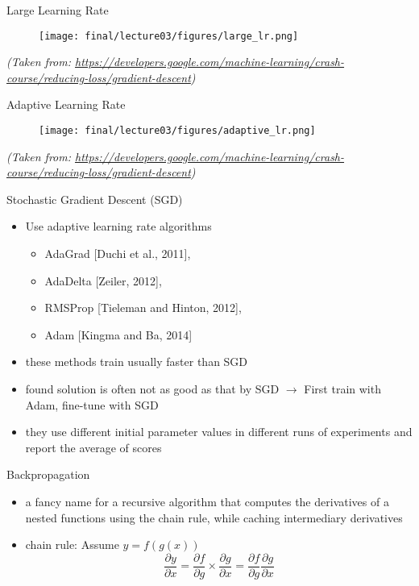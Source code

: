 \begin{frame}{Large Learning Rate}
         \begin{figure}
        \centering
          \texttt{[image: final/lecture03/figures/large\_lr.png]}
        \end{figure}
\vspace*{\fill}
\textit{\tiny{(Taken from: 
\url{https://developers.google.com/machine-learning/crash-course/reducing-loss/gradient-descent})}}
\end{frame}
\begin{frame}{Adaptive Learning Rate}
         \begin{figure}
        \centering
        \texttt{[image: final/lecture03/figures/adaptive\_lr.png]}
        \end{figure}
\vspace*{\fill}
\textit{\tiny{(Taken from: 
\url{https://developers.google.com/machine-learning/crash-course/reducing-loss/gradient-descent})}}
\end{frame}
\begin{frame}{Stochastic Gradient Descent (SGD)}
    \begin{itemize}
        \item<1-> Use adaptive learning rate algorithms 
        \begin{itemize}
            \item<1->  AdaGrad [Duchi et al., 2011], 
            \item<1-> AdaDelta [Zeiler, 2012], 
            \item<1-> RMSProp [Tieleman and Hinton, 2012], 
            \item<1-> Adam [Kingma and Ba, 2014] 
        \end{itemize}
        \item<2-> these methods train usually faster than SGD
        \item<3-> found solution is often not as good as that by SGD $\rightarrow$ First train with Adam, fine-tune with SGD
        \item<4-> they use different initial parameter values in different runs of experiments and report the average of scores
    \end{itemize}
\end{frame}
\begin{frame}{Backpropagation}
\begin{itemize}
    \item<1-> a fancy name for a recursive algorithm that computes the derivatives of a nested functions using the chain rule, while caching intermediary derivatives 
    \item<2-> chain rule: Assume $y = f(g(x))$
    \begin{equation*}
        \frac{\partial y}{\partial x} = \frac{\partial f}{\partial g}\times \frac{\partial g}{\partial x}   = \frac{\partial f}{\partial g}\frac{\partial g}{\partial x}
    \end{equation*}
\end{itemize}
\end{frame}
